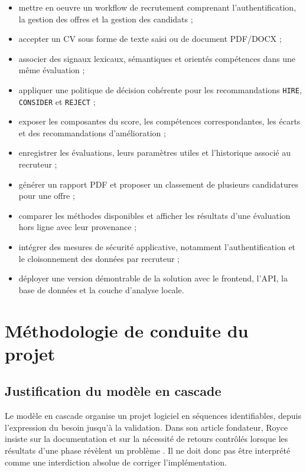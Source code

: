 \begin{itemize}[leftmargin=15mm]
  \item mettre en oeuvre un workflow de recrutement comprenant l'authentification, la gestion des offres et la gestion des candidats ;
  \item accepter un CV sous forme de texte saisi ou de document PDF/DOCX ;
  \item associer des signaux lexicaux, sémantiques et orientés compétences dans une même évaluation ;
  \item appliquer une politique de décision cohérente pour les recommandations \texttt{HIRE}, \texttt{CONSIDER} et \texttt{REJECT} ;
  \item exposer les composantes du score, les compétences correspondantes, les écarts et des recommandations d'amélioration ;
  \item enregistrer les évaluations, leurs paramètres utiles et l'historique associé au recruteur ;
  \item générer un rapport PDF et proposer un classement de plusieurs candidatures pour une offre ;
  \item comparer les méthodes disponibles et afficher les résultats d'une évaluation hors ligne avec leur provenance ;
  \item intégrer des mesures de sécurité applicative, notamment l'authentification et le cloisonnement des données par recruteur ;
  \item déployer une version démontrable de la solution avec le frontend, l'API, la base de données et la couche d'analyse locale.
\end{itemize}

\section{Méthodologie de conduite du projet}

\subsection{Justification du modèle en cascade}
Le modèle en cascade organise un projet logiciel en séquences identifiables, depuis l'expression du besoin jusqu'à la validation. Dans son article fondateur, Royce insiste sur la documentation et sur la nécessité de retours contrôlés lorsque les résultats d'une phase révèlent un problème \cite{royce1970}. Il ne doit donc pas être interprété comme une interdiction absolue de corriger l'implémentation.

